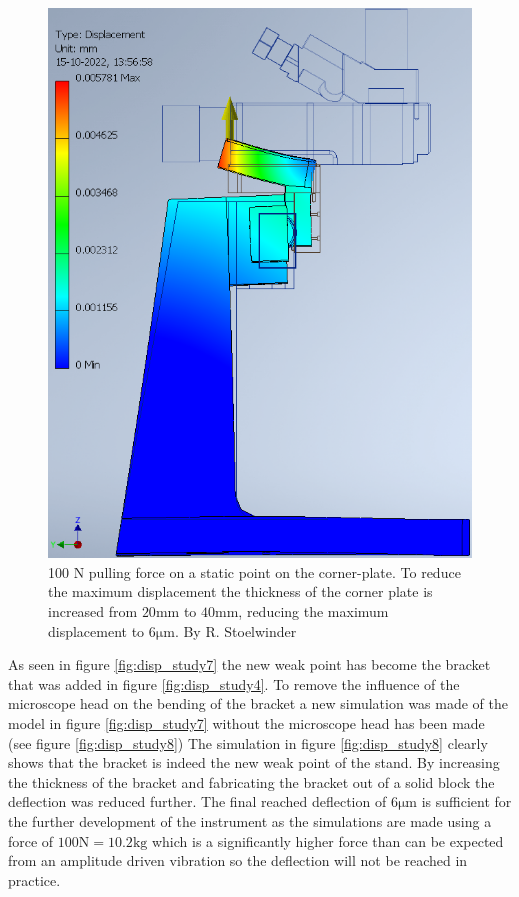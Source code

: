 \documentclass[10pt]{article}
\begin{document}
\begin{figure}[H]
\begin{minipage}[b]{0.45\textwidth}
    \includegraphics[width=1\textwidth]{img/rigidity_simulation/study_10.png}
    \caption{100 N pulling force on a static point on the corner-plate. To reduce the maximum displacement the thickness of the corner plate is increased from  $20\mathrm{mm}$ to $40\mathrm{mm}$, reducing the maximum displacement to $6\mathrm{\mu m}$. By R. Stoelwinder }
    \label{fig:disp_study10}
  \end{minipage}
\end{figure}

As seen in figure \ref{fig:disp_study7} the new weak point has become the bracket that was added in figure \ref{fig:disp_study4}.
To remove the influence of the microscope head on the bending of the bracket a new simulation was made of the model in figure \ref{fig:disp_study7} without the microscope head has been made (see figure \ref{fig:disp_study8})
The simulation in figure \ref{fig:disp_study8} clearly shows that the bracket is indeed the new weak point of the stand. 
By increasing the thickness of the bracket and fabricating the bracket out of a solid block the deflection was reduced further.
The final reached deflection of $6\mathrm{\mu m}$ is sufficient for the further development of the instrument as the simulations are made using a force of $100\mathrm{N} = 10.2 \mathrm{kg}$ which is a significantly higher force than can be expected from an amplitude driven vibration so the deflection will not be reached in practice.\\
\end{document}
